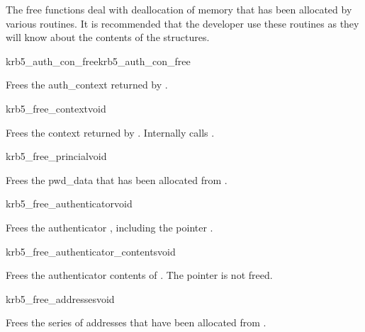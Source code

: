 The free functions deal with deallocation of memory that has been
allocated by various routines. It is recommended that the developer use
these routines as they will know about the contents of the structures.

\begin{funcdecl}{krb5_auth_con_free}{krb5_auth_con_free}{\funcinout}
\end{funcdecl}

Frees the auth_context  returned by
.

\begin{funcdecl}{krb5_free_context}{void}{\funcinout}
\end{funcdecl}

Frees the context returned by . Internally
calls .

\begin{funcdecl}{krb5_free_princial}{void}{\funcinout}
\end{funcdecl}

Frees the pwd_data  that has been allocated from
. 

\begin{funcdecl}{krb5_free_authenticator}{void}{\funcinout}
\end{funcdecl}

Frees the authenticator , including the pointer
. 

\begin{funcdecl}{krb5_free_authenticator_contents}{void}{\funcinout}
\end{funcdecl}

Frees the authenticator contents of . The pointer 
 is not freed.


\begin{funcdecl}{krb5_free_addresses}{void}{\funcinout}
\end{funcdecl}

Frees the series of addresses  that have been allocated from
. 

